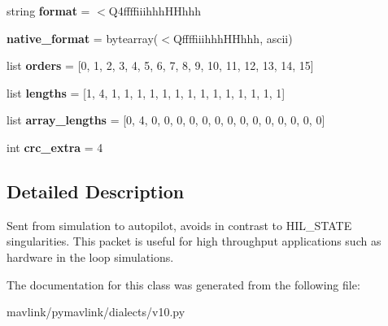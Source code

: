 \begin{DoxyCompactItemize}
\item 
\mbox{\label{classpymavlink_1_1dialects_1_1v10_1_1MAVLink__hil__state__quaternion__message_a25cead7ac523a2dc851f31947f225052}} 
string {\bfseries format} = \textquotesingle{}$<$Q4ffffiiihhh\+H\+Hhhh\textquotesingle{}
\item 
\mbox{\label{classpymavlink_1_1dialects_1_1v10_1_1MAVLink__hil__state__quaternion__message_a7553bf08742d8ae0928770d1f1e8bb41}} 
{\bfseries native\+\_\+format} = bytearray(\textquotesingle{}$<$Qffffiiihhh\+H\+Hhhh\textquotesingle{}, \textquotesingle{}ascii\textquotesingle{})
\item 
\mbox{\label{classpymavlink_1_1dialects_1_1v10_1_1MAVLink__hil__state__quaternion__message_a136636e77c92187232fef02f7878d8f5}} 
list {\bfseries orders} = \mbox{[}0, 1, 2, 3, 4, 5, 6, 7, 8, 9, 10, 11, 12, 13, 14, 15\mbox{]}
\item 
\mbox{\label{classpymavlink_1_1dialects_1_1v10_1_1MAVLink__hil__state__quaternion__message_ac1cf7ba76d48243c574bf27ca224269b}} 
list {\bfseries lengths} = \mbox{[}1, 4, 1, 1, 1, 1, 1, 1, 1, 1, 1, 1, 1, 1, 1, 1\mbox{]}
\item 
\mbox{\label{classpymavlink_1_1dialects_1_1v10_1_1MAVLink__hil__state__quaternion__message_aa55305e91c53c3a46447bc735d12c8ed}} 
list {\bfseries array\+\_\+lengths} = \mbox{[}0, 4, 0, 0, 0, 0, 0, 0, 0, 0, 0, 0, 0, 0, 0, 0\mbox{]}
\item 
\mbox{\label{classpymavlink_1_1dialects_1_1v10_1_1MAVLink__hil__state__quaternion__message_ae7fd26d4f5133375b2f525d33747012c}} 
int {\bfseries crc\+\_\+extra} = 4
\end{DoxyCompactItemize}


\subsection{Detailed Description}
\begin{DoxyVerb}Sent from simulation to autopilot, avoids in contrast to
HIL_STATE singularities. This packet is useful for high
throughput applications such as hardware in the loop
simulations.
\end{DoxyVerb}
 

The documentation for this class was generated from the following file\+:\begin{DoxyCompactItemize}
\item 
mavlink/pymavlink/dialects/v10.\+py\end{DoxyCompactItemize}

